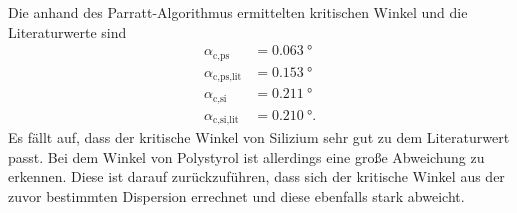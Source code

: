 Die anhand des Parratt-Algorithmus ermittelten kritischen Winkel und die Literaturwerte\cite{V44old} sind
\begin{align*}
    \alpha_\text{c,ps} &= \SI{0.063}{\degree} \\
    \alpha_\text{c,ps,lit} &= \SI{0.153}{\degree} \\
    \alpha_\text{c,si} &= \SI{0.211}{\degree} \\
    \alpha_\text{c,si,lit} &= \SI{0.210}{\degree}.
\end{align*}
Es fällt auf, dass der kritische Winkel von Silizium sehr gut zu dem Literaturwert passt.
Bei dem Winkel von Polystyrol ist allerdings eine große Abweichung zu erkennen.
Diese ist darauf zurückzuführen, dass sich der kritische Winkel aus der zuvor bestimmten Dispersion errechnet
und diese ebenfalls stark abweicht. 

